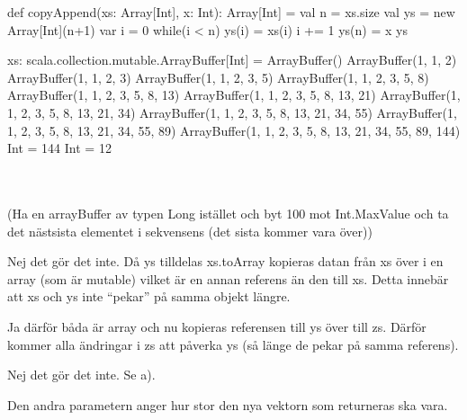 \Task %

\Subtask \begin{Code}
def copyAppend(xs: Array[Int], x: Int): Array[Int] = {
  val n = xs.size
  val ys = new Array[Int](n+1)
  var i = 0
  while(i < n) {
    ys(i) = xs(i)
    i += 1	
  }
  ys(n) = x
  ys
}
\end{Code}

\Subtask \begin{REPL}
xs: scala.collection.mutable.ArrayBuffer[Int] = ArrayBuffer()
ArrayBuffer(1, 1, 2)
ArrayBuffer(1, 1, 2, 3)
ArrayBuffer(1, 1, 2, 3, 5)
ArrayBuffer(1, 1, 2, 3, 5, 8)
ArrayBuffer(1, 1, 2, 3, 5, 8, 13)
ArrayBuffer(1, 1, 2, 3, 5, 8, 13, 21)
ArrayBuffer(1, 1, 2, 3, 5, 8, 13, 21, 34)
ArrayBuffer(1, 1, 2, 3, 5, 8, 13, 21, 34, 55)
ArrayBuffer(1, 1, 2, 3, 5, 8, 13, 21, 34, 55, 89)
ArrayBuffer(1, 1, 2, 3, 5, 8, 13, 21, 34, 55, 89, 144)
Int = 144
Int = 12
\end{REPL}

\Subtask {}\\
\\
(Ha en arrayBuffer av typen Long istället och byt 100 mot Int.MaxValue och ta det nästsista elementet i sekvensens (det sista kommer vara över)) 

\Task %

\Subtask Nej det gör det inte. 
Då ys tilldelas xs.toArray kopieras datan från xs över i en array (som är mutable) vilket är en annan referens än den till xs. 
Detta innebär att xs och ys inte “pekar” på samma objekt längre.

\Subtask Ja därför båda är array och nu kopieras referensen till ys över till zs. 
Därför kommer alla ändringar i zs att påverka ys (så länge de pekar på samma referens).

\Subtask Nej det gör det inte. Se a).


\Task %

\Subtask Den andra parametern anger hur stor den nya vektorn som returneras ska vara.

